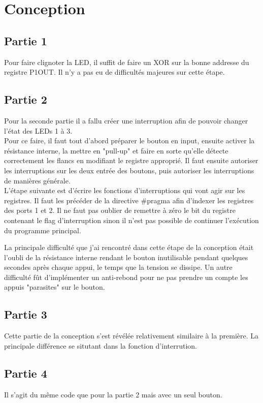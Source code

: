 \section{Conception}
\subsection{Partie 1}
Pour faire clignoter la LED, il suffit de faire un XOR sur la bonne addresse du registre P1OUT. Il n'y a pas eu de difficultés majeures sur cette étape.



\subsection{Partie 2}
Pour la seconde partie il a fallu créer une interruption afin de pouvoir changer l'état des LEDs 1 à 3.\\
Pour ce faire, il faut tout d'abord préparer le bouton en input, ensuite activer la résistance interne, la mettre en "pull-up" et faire en sorte qu'elle détecte correctement les flancs en modifiant le registre approprié.
Il faut ensuite autoriser les interruptions sur les deux entrée des boutons, puis autoriser les interruptions de manières générale.\\
L'étape suivante est d'écrire les fonctions d'interruptions qui vont agir sur les registres. Il faut les précéder de la directive \#pragma afin d'indexer les registres des ports 1 et 2.
Il ne faut pas oublier de remettre à zéro le bit du registre contenant le flag d'interruption sinon il n'est pas possible de continuer l'exécution du programme principal.

La principale difficulté que j'ai rencontré dans cette étape de la conception était l'oubli de la résistance interne rendant le bouton inutilisable pendant quelques secondes après chaque appui, le temps que la tension se dissipe.
Un autre difficulté fût d'implémenter un anti-rebond pour ne pas prendre un compte les appuis "parasites" sur le bouton.



\subsection{Partie 3}
Cette partie de la conception s'est révélée relativement similaire à la première. La principale différence se situtant dans la fonction d'interrution.



\subsection{Partie 4}
Il s'agit du même code que pour la partie 2 mais avec un seul bouton.


